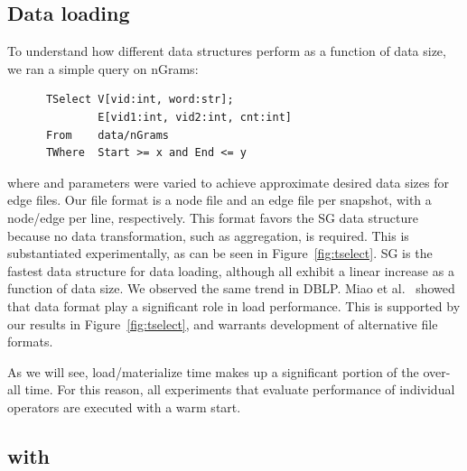 \subsection{Data loading}

To understand how different data structures perform as a function of
data size, we ran a simple  query on nGrams:

\begin{small}
\begin{verbatim}
      TSelect V[vid:int, word:str]; 
              E[vid1:int, vid2:int, cnt:int]
      From    data/nGrams
      TWhere  Start >= x and End <= y
\end{verbatim}
\end{small}

\noindent where  and  parameters were varied to
achieve approximate desired data sizes for edge files.  Our file
format is a node file and an edge file per snapshot, with a node/edge
per line, respectively.  This format favors the SG data structure
because no data transformation, such as aggregation, is required.
This is substantiated experimentally, as can be seen in
Figure~\ref{fig:tselect}.  SG is the fastest data structure for data
loading, although all exhibit a linear increase as a function of data
size.  We observed the same trend in DBLP.  Miao et
al.~\cite{DBLP:journals/tos/MiaoHLWYZPCC15} showed that data format
play a significant role in load performance.  This is supported by our
results in Figure~\ref{fig:tselect}, and warrants development of
alternative file formats.

As we will see, load/materialize time makes up a significant portion
of the over-all time.  For this reason, all experiments that evaluate
performance of individual \ql operators are executed with a warm
start.



\subsection{ with }
\label{sec:exp:tgroup}

